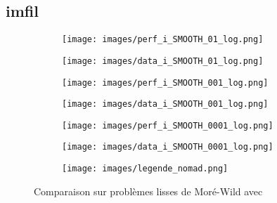 	\subsection{imfil}
	\begin{figure}[!htb] %
		\centering
		\begin{subfigure}{0.43\textwidth}
			\texttt{[image: images/perf\_i\_SMOOTH\_01\_log.png]}
		\end{subfigure}%
		\begin{subfigure}{0.43\textwidth}
			\texttt{[image: images/data\_i\_SMOOTH\_01\_log.png]}
		\end{subfigure}
		\smallskip
		\begin{subfigure}{0.43\textwidth}
			\texttt{[image: images/perf\_i\_SMOOTH\_001\_log.png]}
		\end{subfigure}%
		\begin{subfigure}{0.43\textwidth}
			\texttt{[image: images/data\_i\_SMOOTH\_001\_log.png]}
		\end{subfigure}
		\smallskip
		\begin{subfigure}{0.43\textwidth}
			\texttt{[image: images/perf\_i\_SMOOTH\_0001\_log.png]}
		\end{subfigure}%
		\begin{subfigure}{0.43\textwidth}
			\texttt{[image: images/data\_i\_SMOOTH\_0001\_log.png]}
		\end{subfigure}
		\smallskip
		\begin{subfigure}{0.95\textwidth}
			\texttt{[image: images/legende\_nomad.png]}
		\end{subfigure}
		\caption{Comparaison sur problèmes lisses de Moré-Wild avec \CS} \label{fig:1}
	\end{figure}
	\clearpage
